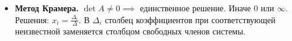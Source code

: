 \begin{itemize}
\begin{multline*}
    \right| = a_{1}b_{1}c_{1} + a_{3}b_{1}c_{2} + a_{2}b_{3}c_{1} -\\- a_{3}b_{2}c_{1} - a_{1}b_{3}c_{2} - a_{2}b_{1}c_{3}
    \end{multline*}
    $\Delta = \sum_{j = 1}^{n} (-1)^{j + 1} \cdot a_{1, j} \cdot \bar{M_{j}^{1}}$, $\bar{M_{j}^{1}}$ --- определитель матрицы, полученной вычеркиванием $1$ строки и $j$ стоблца.
    \item \textbf{Метод Крамера.} $\det A \neq 0 \implies$ единственное решение. Иначе $0$ или $\infty$.
    Решения: $\displaystyle x_{i} = \frac{\Delta_{i}}{\Delta}$. В $\Delta_{i}$ столбец коэффициентов при соответствующей неизвестной заменяется столбцом свободных членов системы.
\end{itemize}
